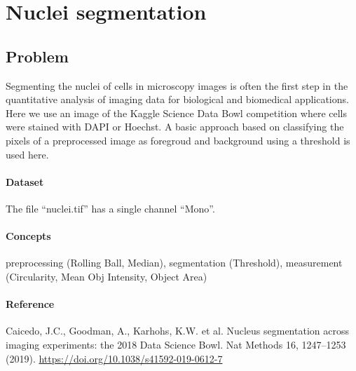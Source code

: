 \section{Nuclei segmentation} \label{sec:nuclei-segmentation}

\subsection{Problem}

Segmenting the nuclei of cells in microscopy images is often the first step in the quantitative analysis of imaging data for biological and biomedical applications. Here we use an image of the Kaggle Science Data Bowl competition where cells were stained with DAPI or Hoechst. A basic approach based on classifying the pixels of a preprocessed image as foregroud and background using a threshold is used here.

\paragraph{Dataset} The file ``nuclei.tif'' has a single channel ``Mono''.

\paragraph{Concepts} preprocessing (Rolling Ball, Median), segmentation (Threshold), measurement (Circularity, Mean Obj Intensity, Object Area)


\paragraph{Reference} Caicedo, J.C., Goodman, A., Karhohs, K.W. et al. Nucleus segmentation across imaging experiments: the 2018 Data Science Bowl. Nat Methods 16, 1247–1253 (2019). \url{https://doi.org/10.1038/s41592-019-0612-7}


